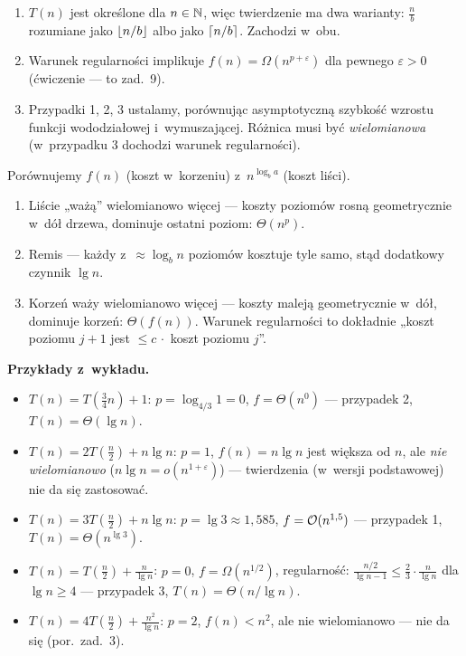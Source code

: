 \documentclass[11pt]{article}
\begin{document}
\begin{uwaga}[z wykładu]
\begin{enumerate}
\item $T(n)$ jest określone dla $n\in\mathbb{N}$, więc twierdzenie ma dwa warianty:
$\frac nb$ rozumiane jako $\left\lfloor n/b \right\rfloor$ albo jako $\left\lceil n/b \right\rceil$. Zachodzi w~obu.
\item Warunek regularności implikuje $f(n)=\Omega(n^{p+\varepsilon})$ dla
pewnego $\varepsilon>0$ (ćwiczenie --- to zad.~9).
\item Przypadki 1, 2, 3 ustalamy, porównując asymptotyczną szybkość wzrostu
funkcji wododziałowej i~wymuszającej. Różnica musi być
\emph{wielomianowa} (w~przypadku 3 dochodzi warunek regularności).
\end{enumerate}
\end{uwaga}

\begin{intuicja}
Porównujemy $f(n)$ (koszt w~korzeniu) z~$n^{\log_b a}$ (koszt liści).
\begin{enumerate}
\item Liście „ważą” wielomianowo więcej --- koszty poziomów rosną
geometrycznie w~dół drzewa, dominuje ostatni poziom: $\Theta(n^p)$.
\item Remis --- każdy z~$\approx\log_b n$ poziomów
kosztuje tyle samo, stąd dodatkowy czynnik $\lg n$.
\item Korzeń waży wielomianowo więcej --- koszty maleją geometrycznie w~dół,
dominuje korzeń: $\Theta(f(n))$. Warunek regularności to dokładnie
„koszt poziomu $j+1$ jest $\le c\,\cdot$ koszt poziomu $j$”.
\end{enumerate}
\end{intuicja}

\textbf{Przykłady z~wykładu.}
\begin{itemize}
\item $T(n)=T(\frac34n)+1$: $p=\log_{4/3}1=0$, $f=\Theta(n^0)$ --- przypadek 2,
$T(n)=\Theta(\lg n)$.
\item $T(n)=2T(\frac n2)+n\lg n$: $p=1$, $f(n)=n\lg n$ jest większa od $n$,
ale \emph{nie wielomianowo} ($n\lg n=o(n^{1+\varepsilon})$) --- twierdzenia
(w~wersji podstawowej) nie da się zastosować.
\item $T(n)=3T(\frac n2)+n\lg n$: $p=\lg3\approx1{,}585$,
$f=\mathcal{O}(n^{1{,}5})$ --- przypadek 1, $T(n)=\Theta(n^{\lg 3})$.
\item $T(n)=T(\frac n2)+\frac n{\lg n}$: $p=0$, $f=\Omega(n^{1/2})$,
regularność: $\frac{n/2}{\lg n-1}\le\frac23\cdot\frac n{\lg n}$ dla $\lg n\ge4$
--- przypadek 3, $T(n)=\Theta(n/\lg n)$.
\item $T(n)=4T(\frac n2)+\frac{n^2}{\lg n}$: $p=2$, $f(n)<n^2$, ale nie
wielomianowo --- nie da się (por.\ zad.~3).
\end{itemize}
\end{document}
